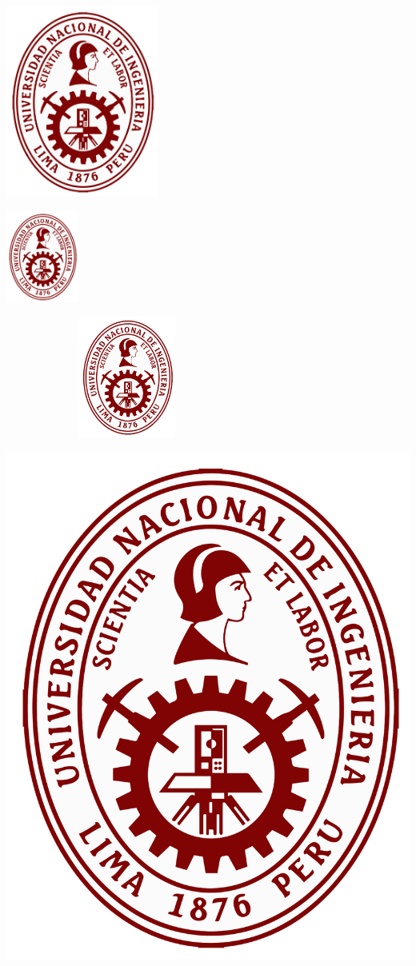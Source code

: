 \documentclass[12pt,a4paper]{article}
\begin{document}
\includegraphics[width=5cm]{uni}

\includegraphics[height=3cm]{uni}

\includegraphics[width=8cm,height=4cm]{uni}

\includegraphics[scale=0.1]{uni}
	
\end{document}
